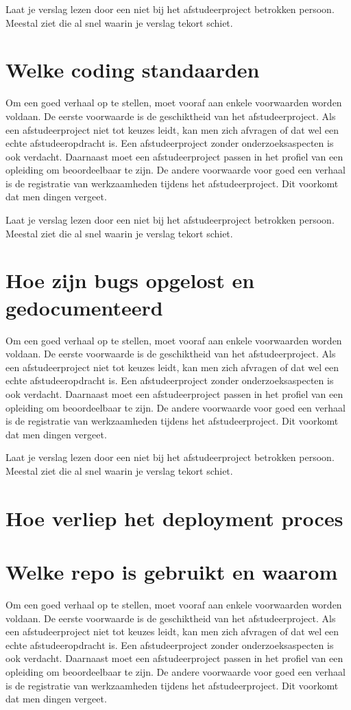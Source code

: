 		
		Laat je verslag lezen door een niet bij het afstudeerproject betrokken
		persoon. Meestal ziet die al snel waarin je verslag tekort schiet.
		\section{Welke coding standaarden}
		Om een goed verhaal op te stellen, moet vooraf aan enkele voorwaarden
		worden voldaan. De eerste voorwaarde is de geschiktheid van het
		afstudeerproject. Als een afstudeerproject niet tot keuzes leidt, kan
		men zich afvragen of dat wel een echte afstudeeropdracht is. Een
		afstudeerproject zonder onderzoeksaspecten is ook verdacht. Daarnaast
		moet een afstudeerproject passen in het profiel van een opleiding om
		beoordeelbaar te zijn. De andere voorwaarde voor goed een verhaal is
		de registratie van werkzaamheden tijdens het afstudeerproject. Dit
		voorkomt dat men dingen vergeet.
		
		
		Laat je verslag lezen door een niet bij het afstudeerproject betrokken
		persoon. Meestal ziet die al snel waarin je verslag tekort schiet.
		\section{Hoe zijn bugs opgelost en gedocumenteerd}
		Om een goed verhaal op te stellen, moet vooraf aan enkele voorwaarden
		worden voldaan. De eerste voorwaarde is de geschiktheid van het
		afstudeerproject. Als een afstudeerproject niet tot keuzes leidt, kan
		men zich afvragen of dat wel een echte afstudeeropdracht is. Een
		afstudeerproject zonder onderzoeksaspecten is ook verdacht. Daarnaast
		moet een afstudeerproject passen in het profiel van een opleiding om
		beoordeelbaar te zijn. De andere voorwaarde voor goed een verhaal is
		de registratie van werkzaamheden tijdens het afstudeerproject. Dit
		voorkomt dat men dingen vergeet.
		
		
		Laat je verslag lezen door een niet bij het afstudeerproject betrokken
		persoon. Meestal ziet die al snel waarin je verslag tekort schiet.
		\section{Hoe verliep het deployment proces}
		\section{Welke repo is gebruikt en waarom}
		Om een goed verhaal op te stellen, moet vooraf aan enkele voorwaarden
		worden voldaan. De eerste voorwaarde is de geschiktheid van het
		afstudeerproject. Als een afstudeerproject niet tot keuzes leidt, kan
		men zich afvragen of dat wel een echte afstudeeropdracht is. Een
		afstudeerproject zonder onderzoeksaspecten is ook verdacht. Daarnaast
		moet een afstudeerproject passen in het profiel van een opleiding om
		beoordeelbaar te zijn. De andere voorwaarde voor goed een verhaal is
		de registratie van werkzaamheden tijdens het afstudeerproject. Dit
		voorkomt dat men dingen vergeet.

